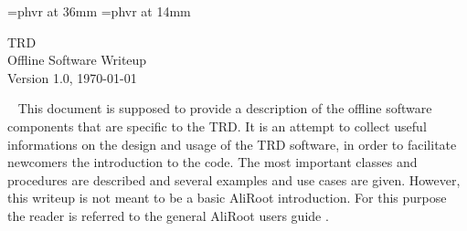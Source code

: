 \documentclass{alicetdr}
\begin{document}
%
%
%
%
\font\HUGEA=phvr at 36mm  %
\font\HUGEB=phvr at 14mm  %
%
\begin{titlepage}
%
\vspace{10.0cm}
%
\begin{center}
{\HUGEA T\hspace{5.mm}R\hspace{5.mm}D} \\
%
\vspace{3.5cm}
{\HUGEB Offline Software Writeup} \\
%
\vspace{2.0cm}
{\Large Version 1.0, \today}\\
%
\vfill
%
\vspace{5.5cm}
%
\end{center}
%
\end{titlepage}
%
%
%
\onecolumn
\thispagestyle{empty}
\mbox{  }
%
\setcounter{page}{0}
\onecolumn
%
%
%
%
%
%
\thispagestyle{empty}
\tableofcontents
%
%
%
%
\newpage
\setcounter{chapter}{0}
\setcounter{section}{0}
\thispagestyle{empty}
%
This document is supposed to provide a description of the offline
software components that are specific to the TRD.  It is an attempt
to collect useful informations on the design and usage of the TRD
software, in order to facilitate newcomers the introduction to the
code.  The most important classes and procedures are described and
several examples and use cases are given.
However, this writeup is not meant to be a basic AliRoot introduction.
For this purpose the reader is referred to the general AliRoot users
guide \cite{ALIROOT}.
%
\newpage
\setcounter{chapter}{1}
\setcounter{section}{0}
\thispagestyle{empty}
%
\end{document}
